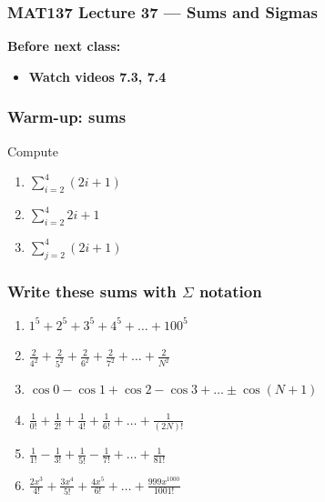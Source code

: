 \documentclass[14pt]{beamer}
\date{}
\title{}
\author{}
\newcommand{\setsize}[1]{\fontsize{#1}{#1}\selectfont} %
\newcommand{\smallerfont}{\setsize{13}} %
\begin{document}
\begin{frame}
	\frametitle{MAT137 Lecture 37 --- Sums and Sigmas}

	\vfill
	{\bf Before next class:}
		\begin{itemize} \normalsize
			\item {\bf Watch videos 7.3, 7.4} 
		\end{itemize}
\end{frame}
	\begin{frame}[t]
		\frametitle{Warm-up: sums}

		Compute

		\begin{enumerate}
			\item ${\displaystyle \sum_{i=2}^{4} (2i+1)}$
				\vfill

			\item ${\displaystyle \sum_{i=2}^4 2i + 1}$
				\vfill

			\item ${\displaystyle \sum_{j=2}^4 (2i + 1)}$
				\vfill
		\end{enumerate}
	\end{frame}
	\begin{frame}[t]
		\smallerfont
		\frametitle{Write these sums with $\Sigma$ notation}

		\begin{enumerate}
			\item ${\displaystyle 1^5 + 2^5 + 3^5 + 4^5 + \ldots + 100^5}$
				\vfill

			\item ${\displaystyle \frac{2}{4^{2}} + \frac{2}{5^{2}} + \frac{2}{6^{2}} + \frac{2}{7^{2}} + \ldots + \frac{2}{N^{2}}}$
				\vfill

			\item ${\displaystyle \cos 0 - \cos 1 + \cos 2 - \cos 3 + %
				\ldots \pm \cos (N+1)}$
				\vfill

			\item ${\displaystyle \frac{1}{0!} + \frac{1}{2!} + \frac{1}{4!} + \frac{1}{6!} + \ldots + \frac{1}{(2N)!}}$
				\vfill

			\item ${\displaystyle \frac{1}{1!} - \frac{1}{3!} + \frac{1}{5!} - \frac{1}{7!} + \ldots + \frac{1}{81!}}$
				\vfill

			\item ${\displaystyle  \frac{2x^{3}}{ 4!} + \frac{3x^{4}}{5!} + \frac{4x^{5}}{6!} + \ldots + \frac{999x^{1000}}{1001!}}$
		\end{enumerate}
	\end{frame}
\end{document}
